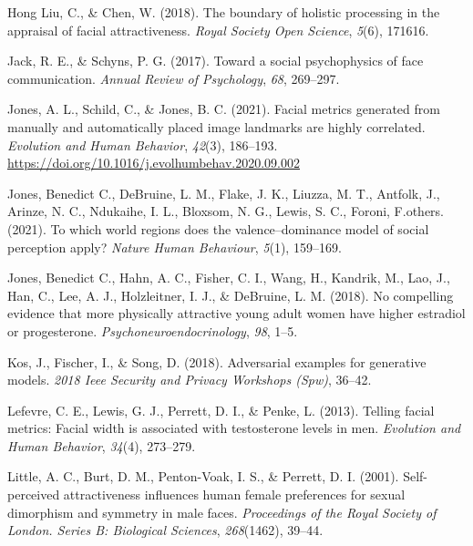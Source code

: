 \documentclass[
  doc,floatsintext]{apa6}
\newlength{\cslhangindent}
\newlength{\cslentryspacingunit} %
\newenvironment{CSLReferences}[2] %
 {%
  \setlength{\parindent}{0pt}
  \ifodd #1
  \let\oldpar\par
  \def\par{\hangindent=\cslhangindent\oldpar}
  \fi
  \setlength{\parskip}{#2\cslentryspacingunit}
 }%
 {}
\begin{document}
\begin{CSLReferences}{1}{0}
\leavevmode{}%
Hong Liu, C., \& Chen, W. (2018). The boundary of holistic processing in the appraisal of facial attractiveness. \emph{Royal Society Open Science}, \emph{5}(6), 171616.

\leavevmode{}%
Jack, R. E., \& Schyns, P. G. (2017). Toward a social psychophysics of face communication. \emph{Annual Review of Psychology}, \emph{68}, 269--297.

\leavevmode{}%
Jones, A. L., Schild, C., \& Jones, B. C. (2021). Facial metrics generated from manually and automatically placed image landmarks are highly correlated. \emph{Evolution and Human Behavior}, \emph{42}(3), 186--193. \url{https://doi.org/10.1016/j.evolhumbehav.2020.09.002}

\leavevmode{}%
Jones, Benedict C., DeBruine, L. M., Flake, J. K., Liuzza, M. T., Antfolk, J., Arinze, N. C., Ndukaihe, I. L., Bloxsom, N. G., Lewis, S. C., Foroni, F.others. (2021). To which world regions does the valence--dominance model of social perception apply? \emph{Nature Human Behaviour}, \emph{5}(1), 159--169.

\leavevmode{}%
Jones, Benedict C., Hahn, A. C., Fisher, C. I., Wang, H., Kandrik, M., Lao, J., Han, C., Lee, A. J., Holzleitner, I. J., \& DeBruine, L. M. (2018). No compelling evidence that more physically attractive young adult women have higher estradiol or progesterone. \emph{Psychoneuroendocrinology}, \emph{98}, 1--5.

\leavevmode{}%
Kos, J., Fischer, I., \& Song, D. (2018). Adversarial examples for generative models. \emph{2018 Ieee Security and Privacy Workshops (Spw)}, 36--42.

\leavevmode{}%
Lefevre, C. E., Lewis, G. J., Perrett, D. I., \& Penke, L. (2013). Telling facial metrics: Facial width is associated with testosterone levels in men. \emph{Evolution and Human Behavior}, \emph{34}(4), 273--279.

\leavevmode{}%
Little, A. C., Burt, D. M., Penton-Voak, I. S., \& Perrett, D. I. (2001). Self-perceived attractiveness influences human female preferences for sexual dimorphism and symmetry in male faces. \emph{Proceedings of the Royal Society of London. Series B: Biological Sciences}, \emph{268}(1462), 39--44.


\end{CSLReferences}
\end{document}
